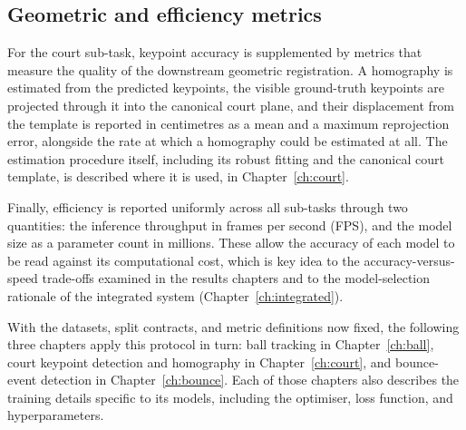 \subsection{Geometric and efficiency metrics}
\label{sec:meth-metrics-geom}

For the court sub-task, keypoint accuracy is supplemented by metrics that
measure the quality of the downstream geometric registration. A homography is
estimated from the predicted keypoints, the visible ground-truth keypoints are
projected through it into the canonical court plane, and their displacement from
the template is reported in centimetres as a mean and a maximum reprojection
error, alongside the rate at which a homography could be estimated at all. The
estimation procedure itself, including its robust fitting and the canonical
court template, is described where it is used, in Chapter~\ref{ch:court}.

Finally, efficiency is reported uniformly across all sub-tasks through two
quantities: the inference throughput in frames per second (FPS), and the model
size as a parameter count in millions. These allow the accuracy of each model to
be read against its computational cost, which is key idea to the accuracy-versus-
speed trade-offs examined in the results chapters and to the model-selection
rationale of the integrated system (Chapter~\ref{ch:integrated}).

With the datasets, split contracts, and metric definitions now fixed, the
following three chapters apply this protocol in turn: ball tracking in
Chapter~\ref{ch:ball}, court keypoint detection and homography in
Chapter~\ref{ch:court}, and bounce-event detection in Chapter~\ref{ch:bounce}.
Each of those chapters also describes the training details specific to its
models, including the optimiser, loss function, and hyperparameters.
